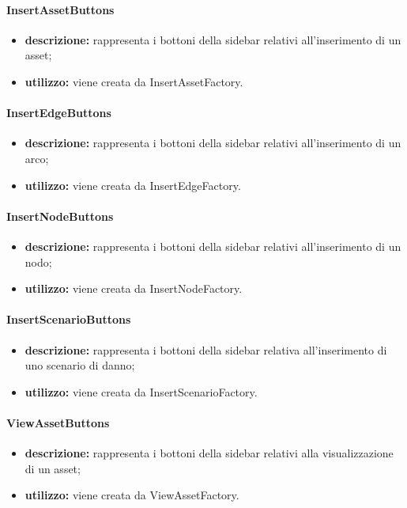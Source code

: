 \paragraph{InsertAssetButtons}
\begin{itemize}
	\item \textbf{descrizione:} rappresenta i bottoni della sidebar relativi all'inserimento di un asset;
	\item \textbf{utilizzo:} viene creata da InsertAssetFactory.
\end{itemize}
\paragraph{InsertEdgeButtons}
\begin{itemize}
	\item \textbf{descrizione:} rappresenta i bottoni della sidebar relativi all'inserimento di un arco;
	\item \textbf{utilizzo:} viene creata da InsertEdgeFactory.
\end{itemize}
\paragraph{InsertNodeButtons}
\begin{itemize}
	\item \textbf{descrizione:} rappresenta i bottoni della sidebar relativi all'inserimento di un nodo;
	\item \textbf{utilizzo:} viene creata da InsertNodeFactory.
\end{itemize}
\paragraph{InsertScenarioButtons}
\begin{itemize}
	\item \textbf{descrizione:} rappresenta i bottoni della sidebar relativa all'inserimento di uno scenario di danno;
	\item \textbf{utilizzo:} viene creata da InsertScenarioFactory.
\end{itemize}
\paragraph{ViewAssetButtons}
\begin{itemize}
	\item \textbf{descrizione:} rappresenta i bottoni della sidebar relativi alla visualizzazione di un asset;
	\item \textbf{utilizzo:} viene creata da ViewAssetFactory.
\end{itemize}

